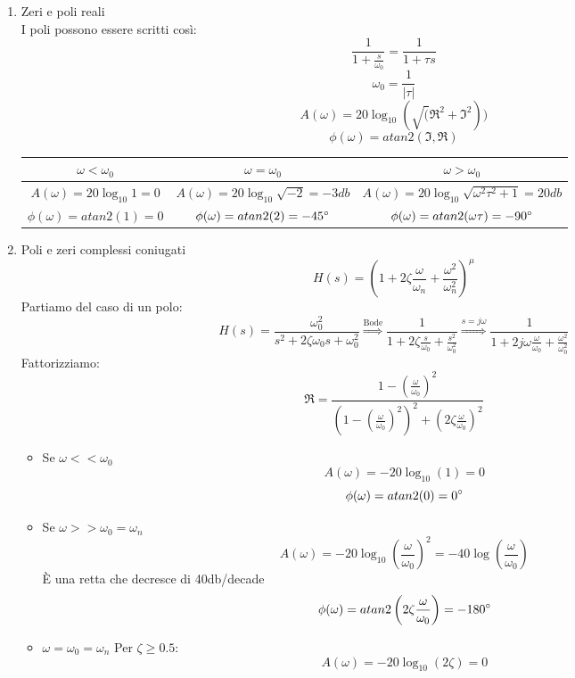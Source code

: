 \documentclass[a4paper]{article}
\begin{document}
\begin{enumerate}
\begin{table}[H]
    \end{table}
    \item Zeri e poli reali 
    \\
    I poli possono essere scritti così:
    \[\frac{1}{1+\frac{s}{\omega_0}} = \frac{1}{1+  \tau s}\]
    \[\omega_0 = \frac{1}{|\tau|}\]
    \[A(\omega) = 20\log_{10} (\sqrt(\Re^2 + \Im^2))\]
    \[\phi(\omega) = atan2(\Im , \Re)\]
    \begin{table}[H]
        \centering
        \begin{tabular}{c|c|c}
            $\omega < \omega_0$ & $\omega = \omega_0$ & $\omega > \omega_0$\\
            \hline
            $A(\omega) = 20\log_{10} 1 = 0$ & $A(\omega) = 20\log_{10} \sqrt{-2} = -3db$ & $A(\omega) = 20\log_{10} \sqrt{\omega^2\tau^2 + 1} = 20db$\\
            $\phi(\omega) = atan2(1) = 0$ & $\phi(\omega) = atan2(2) = -45\degree$ & $\phi(\omega) = atan2(\omega\tau) = -90\degree$\\
        \end{tabular}
    \end{table}
    \item Poli e zeri complessi coniugati
    \[H(s) = \left(1 + 2\zeta\frac{\omega}{\omega_n} + \frac{\omega^2}{\omega_n^2}  \right)^{\mu}\]
    Partiamo del caso di un polo:
    \[H(s) = \frac{\omega_0^2}{s^2 + 2\zeta\omega_0s+ \omega_0^2} \stackrel{\text{Bode}}{\Longrightarrow} \frac{1}{1 + 2\zeta\frac{s}{\omega_0} + \frac{s^2}{\omega_0^2}} \stackrel{s=j\omega}{\Longrightarrow} \frac{1}{1 +2j\omega\frac{\omega}{\omega_0} + \frac{\omega^2}{\omega_0^2}}\]
    Fattorizziamo:
    \[\Re = \frac{1 - \left(\frac{\omega}{\omega_0}\right)^2}{\left(1- \left(\frac{\omega}{\omega_0}\right)^2\right)^2 + \left(2\zeta\frac{\omega}{\omega_0}\right)^2}\]
    \begin{itemize}
        \item Se $\omega << \omega_0$
        \[A(\omega) = -20\log_{10}(1) = 0\]
        \[\phi(\omega) = atan2(0) = 0\degree\]
        \item Se $\omega >> \omega_0 = \omega_n$
        \[A(\omega) = -20\log_{10} \left(\frac{\omega}{\omega_0}\right)^2 = -40\log \left(\frac{\omega}{\omega_0}\right)\]
        È una retta che decresce di 40db/decade
        \[\phi(\omega) = atan2\left(2\zeta\frac{\omega}{\omega_0}\right) = -180\degree\]
        \item $\omega = \omega_0 = \omega_n$
        Per $\zeta \ge 0.5$:
        \[A(\omega) = -20\log_{10} (2\zeta) = 0\]

\end{itemize}
\end{enumerate}
\end{document}
